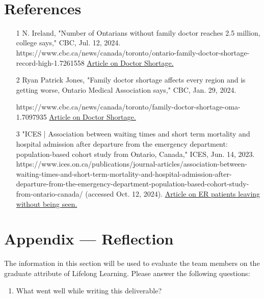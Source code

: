 \documentclass[12pt]{article}
\begin{document}
\begin{itemize}
~\newpage

\section{References}
\begin{itemize}
  \item
  [1]N. Ireland, "Number of Ontarians without family doctor reaches 2.5 million, college says," CBC, Jul. 12, 2024. https://www.cbc.ca/news/canada/toronto/ontario-family-doctor-shortage-record-high-1.7261558
  \href{https://www.cbc.ca/news/canada/toronto/ontario-family-doctor-shortage-record-high-1.7261558}{Article on Doctor Shortage.}
  \item 
  [2]Ryan Patrick Jones, "Family doctor shortage affects every region and is getting worse, Ontario Medical Association says," CBC, Jan. 29, 2024.
  
  https://www.cbc.ca/news/canada/toronto/family-doctor-shortage-oma-1.7097935
  \href{https://www.cbc.ca/news/canada/toronto/family-doctor-shortage-oma-1.7097935}{Article on Doctor Shortage.}
  \item
  [3]"ICES | Association between waiting times and short term mortality and hospital admission after departure from the emergency department: population-based cohort study from Ontario, Canada," ICES, Jun. 14, 2023. https://www.ices.on.ca/publications/journal-articles/association-between-waiting-times-and-short-term-mortality-and-hospital-admission-after-departure-from-the-emergency-department-population-based-cohort-study-from-ontario-canada/ (accessed Oct. 12, 2024).
  \href{https://www.ices.on.ca/publications/journal-articles/association-between-waiting-times-and-short-term-mortality-and-hospital-admission-after-departure-from-the-emergency-department-population-based-cohort-study-from-ontario-canada/}{Article on ER patients leaving without being seen.}
\end{itemize}

\newpage{}
\section*{Appendix --- Reflection}

The information in this section will be used to evaluate the team members on the
graduate attribute of Lifelong Learning.  Please answer the following questions:

\begin{enumerate}
  \item What went well while writing this deliverable?
  

\end{enumerate}
\end{itemize}
\end{document}
